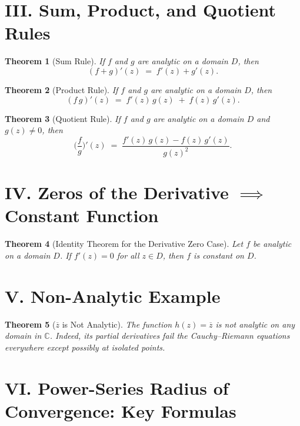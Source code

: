 \documentclass[12pt]{article}
\theoremstyle{plain}
\newtheorem{theorem}{Theorem}
\theoremstyle{definition}
\begin{document}
\section*{III. Sum, Product, and Quotient Rules}

\begin{theorem}[Sum Rule]
\label{thm:sum-rule}
If \(f\) and \(g\) are analytic on a domain \(D\), then
\[
(f + g)'(z) \;=\; f'(z) + g'(z).
\]
\end{theorem}

\begin{theorem}[Product Rule]
\label{thm:product-rule}
If \(f\) and \(g\) are analytic on a domain \(D\), then
\[
(f\,g)'(z) \;=\; f'(z)\,g(z) \;+\; f(z)\,g'(z).
\]
\end{theorem}

\begin{theorem}[Quotient Rule]
\label{thm:quotient-rule}
If \(f\) and \(g\) are analytic on a domain \(D\) and \(g(z)\neq 0\), then
\[
\biggl(\frac{f}{g}\biggr)'(z)
\;=\;
\frac{f'(z)\,g(z) - f(z)\,g'(z)}{g(z)^2}.
\]
\end{theorem}

\section*{IV. Zeros of the Derivative \(\implies\) Constant Function}

\begin{theorem}[Identity Theorem for the Derivative Zero Case]
\label{thm:constant-if-deriv-zero}
Let \(f\) be analytic on a domain \(D\).  If \(f'(z)=0\) for all \(z \in D\), then \(f\) is constant on \(D\).
\end{theorem}

\section*{V. Non-Analytic Example}

\begin{theorem}[\(\overline{z}\) is Not Analytic]
\label{thm:zbar-non-analytic}
The function \(h(z) = \overline{z}\) is \emph{not} analytic on any domain in \(\mathbb{C}\).  Indeed, its partial derivatives fail the Cauchy--Riemann equations everywhere except possibly at isolated points.
\end{theorem}

\section*{VI. Power-Series Radius of Convergence: Key Formulas}
\end{document}
